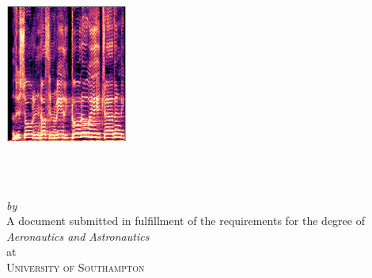 \begin{titlepage}
  \vspace*{2cm}
  \makeatletter
  \centering
  \includegraphics[width=0.3\textwidth]{frontmatter/TitleSpectrogram.png}
  \vspace*{2cm}
  \begin{center}
    \begin{Huge}
      \@title
    \end{Huge}\\[0.1cm]
    \vspace*{1cm}
    \begin{Large}
      \@subtitle
    \end{Large}\\
    \emph{by}\\
    \@author \space {}
    \vfill
    A document submitted in fulfillment
    of the requirements for the degree of\\
    \emph{Aeronautics and Astronautics}\\
    at\\
    \textsc{University of Southampton}\\
  \end{center}
  \makeatother
\end{titlepage}

\newpage
\null
\thispagestyle{empty}
\newpage
